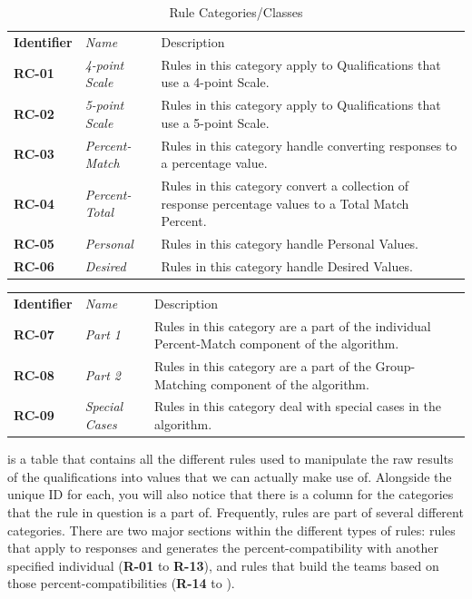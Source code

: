 \documentclass[12pt,letterpaper]{article}
\begin{document}
\begin{table}[H]
	\caption{Rule Categories/Classes}
	\begin{tabu} to 
	    \tableheader{}Identifier & Name & Description\\
		RC-01 & 4-point Scale & Rules in this category apply to Qualifications that use a 4-point Scale.\\
		RC-02 & 5-point Scale & Rules in this category apply to Qualifications that use a 5-point Scale.\\
		RC-03 & Percent-Match & Rules in this category handle converting responses to a percentage value.\\
		RC-04 & Percent-Total & Rules in this category convert a collection of response percentage values to a Total Match Percent.\\
		RC-05 & Personal & Rules in this category handle Personal Values. \\
		RC-06 & Desired & Rules in this category handle Desired Values.\\
	\end{tabu}
\end{table}

\begin{center}
\begin{tabu} to 
	    \tableheader{}Identifier & Name & Description\\
		RC-07 & Part 1 & Rules in this category are a part of the individual Percent-Match component of the algorithm.\\
		RC-08 & Part 2 & Rules in this category are a part of the Group-Matching component of the algorithm.\\
		RC-09 & Special Cases & Rules in this category deal with special cases in the algorithm.\\
\end{tabu}
\end{center}

 is a table that contains all the different rules used to manipulate the raw results of the qualifications into values that we can actually make use of. Alongside the unique ID for each, you will also notice that there is a column for the categories that the rule in question is a part of. Frequently, rules are part of several different categories. There are two major sections within the different types of rules: rules that apply to responses and generates the percent-compatibility with another specified individual ({\bf R-01} to {\bf R-13}), and rules that build the teams based on those percent-compatibilities ({\bf R-14} to {\bf }).
\end{document}
